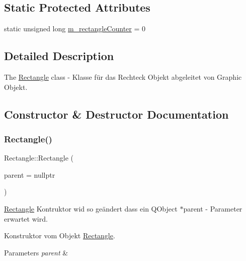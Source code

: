 \subsection*{Static Protected Attributes}
\begin{DoxyCompactItemize}
\item 
static unsigned long \hyperlink{class_rectangle_aa5a0b5d899df185e221e17d032472352}{m\+\_\+rectangle\+Counter} = 0
\end{DoxyCompactItemize}


\subsection{Detailed Description}
The \hyperlink{class_rectangle}{Rectangle} class -\/ Klasse für das Rechteck Objekt abgeleitet von Graphic Objekt. 

\subsection{Constructor \& Destructor Documentation}
\mbox{\label{class_rectangle_a3a431eeb9b63f2108f171416b205f302}} 
\subsubsection{\texorpdfstring{Rectangle()}{Rectangle()}\hspace{0.1cm}{\footnotesize\ttfamily [1/2]}}
{\footnotesize\ttfamily Rectangle\+::\+Rectangle (\begin{DoxyParamCaption}\item[{Q\+Object $\ast$}]{parent = {\ttfamily nullptr} }\end{DoxyParamCaption})}



\hyperlink{class_rectangle}{Rectangle} Kontruktor wid so geändert dass ein Q\+Object $\ast$parent -\/ Parameter erwartet wird. 

Konstruktor vom Objekt \hyperlink{class_rectangle}{Rectangle}.


\begin{DoxyParams}{Parameters}
{\em parent} & \\
\hline
\end{DoxyParams}
\mbox{\label{class_rectangle_a07eb215e78b898b77cb843ceb497b46a}} 
